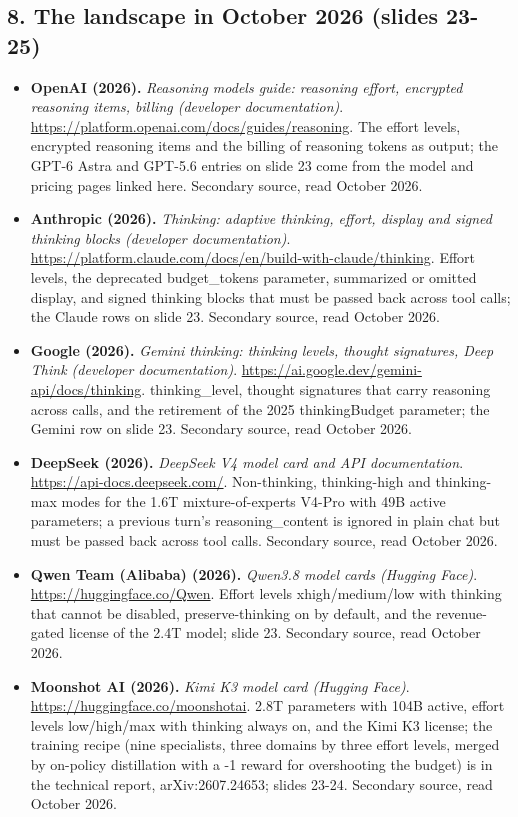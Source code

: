\subsection*{8. The landscape in October 2026 (slides 23-25)}
\begin{itemize}[leftmargin=1.2em,itemsep=3pt]\sloppy
\item \textbf{OpenAI (2026).} \textit{Reasoning models guide: reasoning effort, encrypted reasoning items, billing (developer documentation)}. \url{https://platform.openai.com/docs/guides/reasoning}. The effort levels, encrypted reasoning items and the billing of reasoning tokens as output; the GPT-6 Astra and GPT-5.6 entries on slide 23 come from the model and pricing pages linked here. Secondary source, read October 2026.
\item \textbf{Anthropic (2026).} \textit{Thinking: adaptive thinking, effort, display and signed thinking blocks (developer documentation)}. \url{https://platform.claude.com/docs/en/build-with-claude/thinking}. Effort levels, the deprecated budget\_tokens parameter, summarized or omitted display, and signed thinking blocks that must be passed back across tool calls; the Claude rows on slide 23. Secondary source, read October 2026.
\item \textbf{Google (2026).} \textit{Gemini thinking: thinking levels, thought signatures, Deep Think (developer documentation)}. \url{https://ai.google.dev/gemini-api/docs/thinking}. thinking\_level, thought signatures that carry reasoning across calls, and the retirement of the 2025 thinkingBudget parameter; the Gemini row on slide 23. Secondary source, read October 2026.
\item \textbf{DeepSeek (2026).} \textit{DeepSeek V4 model card and API documentation}. \url{https://api-docs.deepseek.com/}. Non-thinking, thinking-high and thinking-max modes for the 1.6T mixture-of-experts V4-Pro with 49B active parameters; a previous turn's reasoning\_content is ignored in plain chat but must be passed back across tool calls. Secondary source, read October 2026.
\item \textbf{Qwen Team (Alibaba) (2026).} \textit{Qwen3.8 model cards (Hugging Face)}. \url{https://huggingface.co/Qwen}. Effort levels xhigh/medium/low with thinking that cannot be disabled, preserve-thinking on by default, and the revenue-gated license of the 2.4T model; slide 23. Secondary source, read October 2026.
\item \textbf{Moonshot AI (2026).} \textit{Kimi K3 model card (Hugging Face)}. \url{https://huggingface.co/moonshotai}. 2.8T parameters with 104B active, effort levels low/high/max with thinking always on, and the Kimi K3 license; the training recipe (nine specialists, three domains by three effort levels, merged by on-policy distillation with a -1 reward for overshooting the budget) is in the technical report, arXiv:2607.24653; slides 23-24. Secondary source, read October 2026.

\end{itemize}
